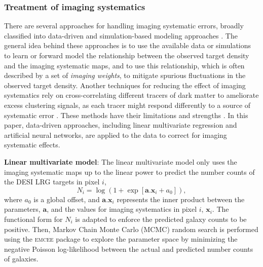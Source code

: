 \subsubsection{Treatment of imaging systematics}
There are several approaches for handling imaging systematic errors, broadly classified into data-driven and simulation-based modeling approaches \citep[see e.g.][]{ross2011, ashley2012MNRAS,Ross17,2012ApJ...761...14H,suchyta2016,delubac2016sdss, prakash2016sdss, Raichoor2017MNRAS.471.3955R, laurent2017clustering, Elvin18, 2018ApJ...863..110B, 2020MNRAS.495.1613R, kong2020,rezaie2021primordial,Everett_2022, chaussidon2022angular,Eggert_2023}. The general idea behind these approaches is to use the available data or simulations to learn or forward model the relationship between the observed target density and the imaging systematic maps, and to use this relationship, which is often described by a set of \textit{imaging weights}, to mitigate spurious fluctuations in the observed target density. Another techniques for reducing the effect of imaging systematics rely on cross-correlating different tracers of dark matter to ameliorate excess clustering signals, as each tracer might respond differently to a source of systematic error \citep[see, e.g.,][]{giannantonio2014improved}. These methods have their limitations and strengths \citep[see, e.g.,][for a review]{2021MNRAS.503.5061W}. In this paper, data-driven approaches, including linear multivariate regression and artificial neural networks, are applied to the data to correct for imaging systematic effects.

\textbf{Linear multivariate model}: The linear multivariate model only uses the imaging systematic maps up to the linear power to predict the number counts of the DESI LRG targets in pixel $i$,
\begin{equation}\label{eq:npred}
    N_{i} = \log ( 1 + \exp[\textbf{a}.\textbf{x}_{i}+a_{0}]),
\end{equation}
where $a_{0}$ is a global offset, and $\textbf{a}.\textbf{x}_{i}$ represents the inner product between the parameters, $\textbf{a}$, and the values for imaging systematics in pixel $i$, $\textbf{x}_{i}$. The functional form for $N_{i}$ is adapted to enforce the predicted galaxy counts to be positive. Then, Markov Chain Monte Carlo (MCMC) random search is performed using the \textsc{emcee} package \citep{2013PASP..125..306F} to explore the parameter space by minimizing the negative Poisson log-likelihood between the actual and predicted number counts of galaxies.

